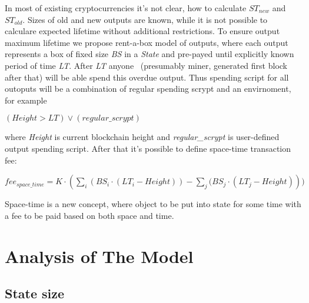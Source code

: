\documentclass[]{article}   %
\newcommand{\authnote}[2]{\marginpar{\parbox{\marginparwidth}{\tiny %
  \textsf{#1 {\textcolor{blue}{notes: #2}}}}}%
  \textcolor{blue}{\textbf{\dag}}}
\newcommand{\authnote}[2]{
  \textsf{#1 \textcolor{blue}{: #2}}}
\newcommand{\authnote}[2]{}
\newcommand{\dnote}[1]{{\authnote{\textcolor{blue}{Dima notes}}{#1}}}
\newcommand{\esse}{Esse}
\newcommand{\state}{\textit{State}}
\begin{document}
In most of existing cryptocurrencies it's not clear, how to calculate \textit{$ST_{new}$} and \textit{$ST_{old}$}. Sizes of old and new outputs are known, while it is not possible to calculare expected lifetime without additional restrictions. To ensure output maximum lifetime we propose rent-a-box model of outputs, where each output represents a box of fixed size \textit{BS} in a \state{} and pre-payed until explicitly known period of time \textit{LT}. After \textit{LT} anyone ~(presumably miner, generated first block after that) will be able spend this overdue output. Thus spending script for all outoputs will be a combination of regular spending scrypt and an envirnoment, for example

$(Height > LT) \lor (regular\_scrypt)$

where \textit{Height} is current blockchain height and \textit{regular\_scrypt} is user-defined output spending script. After that it's possible to define space-time transaction fee:

$fee_{space\_time} = K \cdot (\sum_i{(BS_i \cdot (LT_i - Height))} - \sum_j{(BS_j \cdot (LT_j - Height)}))$

\dnote{current height is problem here, as transaction may not be included to current block}
\dnote{this fee is a part of consensus, everyone should check it, otherwise miner can put some data forever}

Space-time is a new concept, where object to be put into state for some time with a fee to be paid based on both space and time.




\section{Analysis of The Model}
\label{sec:analysis}

\subsection{State size}

\end{document}
